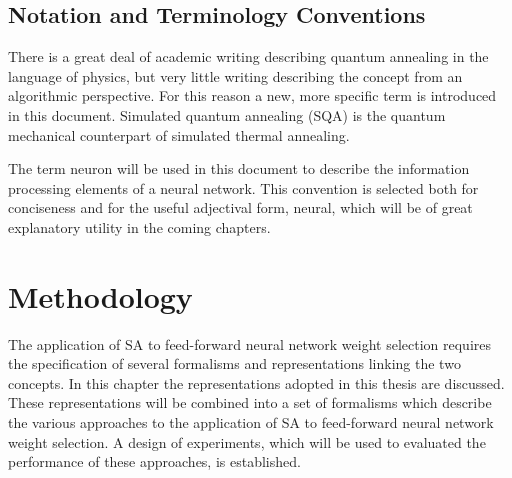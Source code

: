 \documentclass[11pt]{afthesis}
\begin{document}
	
	
	
	\section{Notation and Terminology Conventions}
	
	There is a great deal of academic writing describing quantum annealing in the language of physics, but very little writing describing the concept from an algorithmic perspective. For this reason a new, more specific term is introduced in this document. Simulated quantum annealing (SQA) is the quantum mechanical counterpart of simulated thermal annealing. 
	
	
	The term neuron will be used in this document to describe the information processing elements of a neural network. This convention is selected both for conciseness and for the useful adjectival form, neural, which will be of great explanatory utility in the coming chapters.
	
	
	
	
	\chapter{Methodology}
	
	The application of SA to feed-forward neural network weight selection requires the specification of several formalisms and representations linking the two concepts. In this chapter the representations adopted in this thesis are discussed. These representations will be combined into a set of formalisms which describe the various approaches to the application of SA to feed-forward neural network weight selection. A design of experiments, which will be used to evaluated the performance of these approaches, is established.
	
\end{document}
